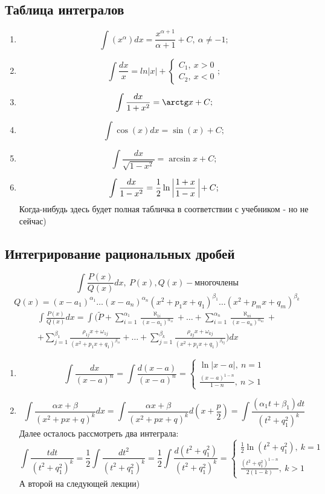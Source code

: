 \subsection{Таблица интегралов}
\begin{enumerate}
    \item \[\int(x^\alpha)dx = \frac{x^{\alpha + 1}}{\alpha + 1} + C, \ \alpha \neq -1;\]
    \item \[\int\frac{dx}{x} = ln|x| + \begin{cases}C_1,\ x>0\\C_2,\ x<0\end{cases};\]
    \item \[\int\frac{dx}{1 + x^2} = \arctg x + C;\]
    \item \[\int \cos(x)dx = \sin(x) + C;\]
    \item \[\int\frac{dx}{\sqrt{1 - x^2}} = \arcsin x + C;\]
    \item \[\int\frac{dx}{1 - x^2} = \frac{1}{2}\ln\ \vline\frac{1+x}{1-x}\ \vline + C;\]
    Когда-нибудь здесь будет полная табличка в соответствии с учебником - но не сейчас)
\end{enumerate}
\subsection{Интегрирование рациональных дробей}
\[\int\frac{P(x)}{Q(x)}dx, \ P(x), Q(x) - \text{многочлены}\]
\[Q(x) = (x-a_1)^{\alpha_1}\dots(x-a_n)^{\alpha_n}(x^2+p_1x+q_1)^{\beta_1}\dots(x^2+p_mx+q_m)^{\beta_k}\]
\begin{multline*}
    \int\frac{P(x)}{Q(x)}dx = \int(\tilde{P} + \sum \limits_{i=1}^{\alpha_1}\frac{\aleph_{1i}}{(x-a_1)^{\alpha_{1i}}} + \dots + \sum \limits_{i=1}^{\alpha_n}\frac{\aleph_{ni}}{(x-a_n)^{\alpha_{ni}}} + \\ + \sum \limits_{j=1}^{\beta_1}\frac{\rho_{1j}x + \omega_{1j}}{(x^2+p_1x+q_1)^{\beta_{1i}}} + \dots + \sum \limits_{j=1}^{\beta_k}\frac{\rho_{kj}x + \omega_{kj}}{(x^2+p_1x+q_1)^{\beta_{kj}}}) dx
\end{multline*}
\begin{enumerate}
    \item \[\int\frac{dx}{(x-a)^n} = \int\frac{d(x-a)}{(x-a)^n} = \begin{cases}\ln|x-a|,\ n = 1\\ \frac{(x-a)^{1-n}}{1-n}, \ n > 1\end{cases}\]
    \item \[\int\frac{\alpha x+\beta}{(x^2+px+q)^k}dx = \int\frac{\alpha x+\beta}{(x^2+px+q)^k}d(x+\frac{p}{2}) = \int\frac{(\alpha_1 t+\beta_1)dt}{(t^2+q_1^2)^k}\]
    Далее осталось рассмотреть два интеграла:
    \[\int\frac{tdt}{(t^2+q_1^2)^k} = \frac{1}{2}\int\frac{dt^2}{(t^2+q_1^2)^k} = \frac{1}{2}\int\frac{d(t^2+q_1^2)}{(t^2+q_1^2)^k} = \begin{cases}\frac{1}{2}\ln(t^2+q_1^2),\ k = 1\\ \frac{(t^2+q_1^2)^{1-n}}{2(1-k)}, \ k > 1\end{cases}\]
    А второй на следующей лекции)
\end{enumerate}